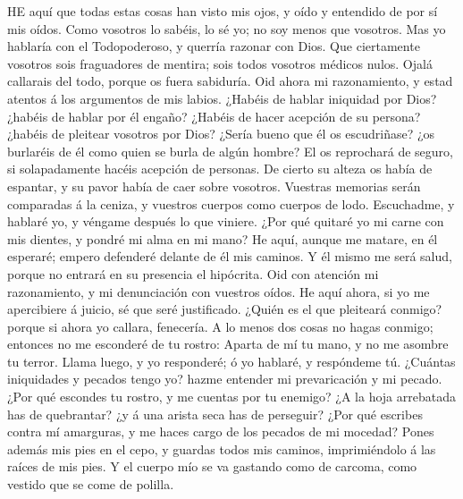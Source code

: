  HE aquí que todas estas cosas han visto mis ojos, y oído
y entendido de por sí mis oídos.  Como vosotros lo sabéis,
lo sé yo; no soy menos que vosotros.  Mas yo hablaría con
el Todopoderoso, y querría razonar con Dios.  Que
ciertamente vosotros sois fraguadores de mentira; sois todos vosotros
médicos nulos.  Ojalá callarais del todo, porque os fuera
sabiduría.  Oid ahora mi razonamiento, y estad atentos á
los argumentos de mis labios.  ¿Habéis de hablar iniquidad
por Dios? ¿habéis de hablar por él engaño?  ¿Habéis de
hacer acepción de su persona? ¿habéis de pleitear vosotros por Dios?
 ¿Sería bueno que él os escudriñase? ¿os burlaréis de él
como quien se burla de algún hombre?  El os reprochará de
seguro, si solapadamente hacéis acepción de personas.  De
cierto su alteza os había de espantar, y su pavor había de caer sobre
vosotros.  Vuestras memorias serán comparadas á la
ceniza, y vuestros cuerpos como cuerpos de lodo. 
Escuchadme, y hablaré yo, y véngame después lo que viniere.
 ¿Por qué quitaré yo mi carne con mis dientes, y pondré
mi alma en mi mano?  He aquí, aunque me matare, en él
esperaré; empero defenderé delante de él mis caminos.  Y
él mismo me será salud, porque no entrará en su presencia el hipócrita.
 Oid con atención mi razonamiento, y mi denunciación con
vuestros oídos.  He aquí ahora, si yo me apercibiere á
juicio, sé que seré justificado.  ¿Quién es el que
pleiteará conmigo? porque si ahora yo callara, fenecería.
 A lo menos dos cosas no hagas conmigo; entonces no me
esconderé de tu rostro:  Aparta de mí tu mano, y no me
asombre tu terror.  Llama luego, y yo responderé; ó yo
hablaré, y respóndeme tú.  ¿Cuántas iniquidades y pecados
tengo yo? hazme entender mi prevaricación y mi pecado. 
¿Por qué escondes tu rostro, y me cuentas por tu enemigo?
 ¿A la hoja arrebatada has de quebrantar? ¿y á una arista
seca has de perseguir?  ¿Por qué escribes contra mí
amarguras, y me haces cargo de los pecados de mi mocedad?
 Pones además mis pies en el cepo, y guardas todos mis
caminos, imprimiéndolo á las raíces de mis pies.  Y el
cuerpo mío se va gastando como de carcoma, como vestido que se come de
polilla.

